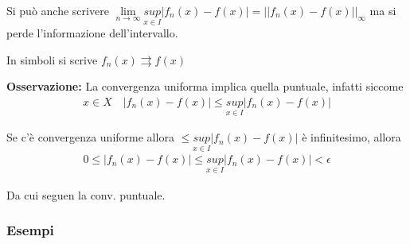 Si può anche scrivere $\underset{n\rightarrow \infty}{\lim} \underset{x\in I}{sup}| f_n(x) - f(x)| = ||f_n(x) - f(x)||_\infty$ ma si perde l'informazione dell'intervallo.

\bigskip

In simboli si scrive $f_n(x) \rightrightarrows f(x)$

\bigskip

\textbf{Osservazione:} La convergenza uniforma implica quella puntuale, infatti siccome
\begin{align}
x \in X \quad | f_n(x) - f(x)| \leq\underset{x\in I}{sup}| f_n(x) - f(x)|
\end{align}

Se c'è convergenza uniforme allora $\leq\underset{x\in I}{sup}| f_n(x) - f(x)|$ è infinitesimo, allora
\begin{align}
0 \leq| f_n(x) - f(x)| \leq \underset{x\in I}{sup}| f_n(x) - f(x)|<\epsilon 
\end{align}

Da cui seguen la conv. puntuale.

\subsubsection{Esempi}


